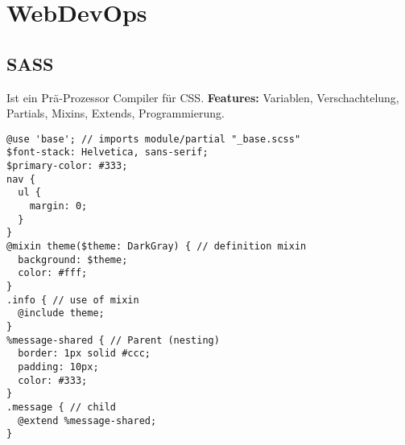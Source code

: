 
\section{WebDevOps}
\subsection{SASS}
Ist ein Prä-Prozessor Compiler für CSS.
\textbf{Features:} Variablen, Verschachtelung, Partials, Mixins, Extends, Programmierung.

\begin{lstlisting}[style=htmlcssjs]
@use 'base'; // imports module/partial "_base.scss"
$font-stack: Helvetica, sans-serif;
$primary-color: #333;
nav {
  ul {
    margin: 0;
  }
}
@mixin theme($theme: DarkGray) { // definition mixin
  background: $theme;
  color: #fff;
}
.info { // use of mixin
  @include theme;
}  
%message-shared { // Parent (nesting)
  border: 1px solid #ccc;
  padding: 10px;
  color: #333;
}
.message { // child
  @extend %message-shared;
}
\end{lstlisting}